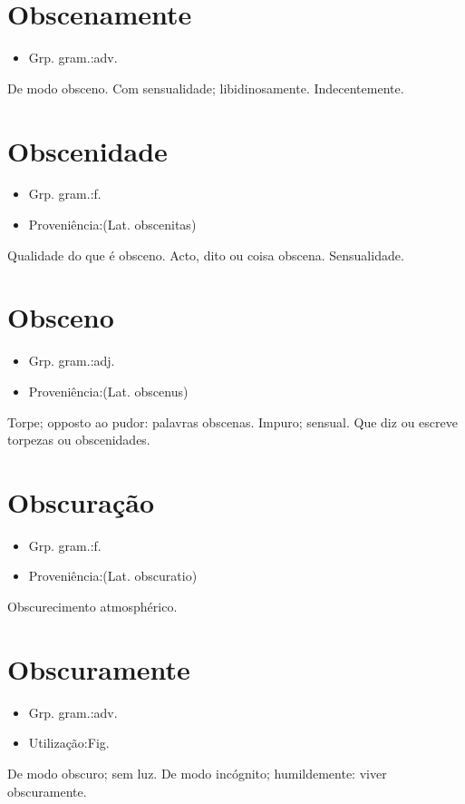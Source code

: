 \section{Obscenamente}
\begin{itemize}
\item {Grp. gram.:adv.}
\end{itemize}
De modo obsceno.
Com sensualidade; libidinosamente.
Indecentemente.
\section{Obscenidade}
\begin{itemize}
\item {Grp. gram.:f.}
\end{itemize}
\begin{itemize}
\item {Proveniência:(Lat. \textunderscore obscenitas\textunderscore )}
\end{itemize}
Qualidade do que é obsceno.
Acto, dito ou coisa obscena.
Sensualidade.
\section{Obsceno}
\begin{itemize}
\item {Grp. gram.:adj.}
\end{itemize}
\begin{itemize}
\item {Proveniência:(Lat. \textunderscore obscenus\textunderscore )}
\end{itemize}
Torpe; opposto ao pudor: \textunderscore palavras obscenas\textunderscore .
Impuro; sensual.
Que diz ou escreve torpezas ou obscenidades.
\section{Obscuração}
\begin{itemize}
\item {Grp. gram.:f.}
\end{itemize}
\begin{itemize}
\item {Proveniência:(Lat. \textunderscore obscuratio\textunderscore )}
\end{itemize}
Obscurecimento atmosphérico.
\section{Obscuramente}
\begin{itemize}
\item {Grp. gram.:adv.}
\end{itemize}
\begin{itemize}
\item {Utilização:Fig.}
\end{itemize}
De modo obscuro; sem luz.
De modo incógnito; humildemente: \textunderscore viver obscuramente\textunderscore .

